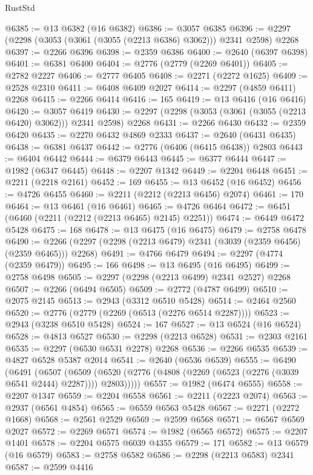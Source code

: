 \begin{lexlean}{RustStd}
\begin{coremodule}
@6385 := @13 @6382 (@16 @6382)
@6386 := @3057 @6385
@6396 := @2297 (@2298 (@3053 (@3061 (@3055 (@2213 @6386) @3062))) @2341 @2598) @2268
@6397 := @2266 @6396
@6398 := @2359 @6386
@6400 := @2640 (@6397 @6398)
@6401 := @6381 @6400
@6404 := @2776 (@2779 (@2269 @6401))
@6405 := @2782 @2227
@6406 := @2777 @6405
@6408 := @2271 (@2272 @1625)
@6409 := @2528 @2310
@6411 := @6408 @6409 @2027
@6414 := @2297 (@4859 @6411) @2268
@6415 := @2266 @6414
@6416 := 165
@6419 := @13 @6416 (@16 @6416)
@6420 := @3057 @6419
@6430 := @2297 (@2298 (@3053 (@3061 (@3055 (@2213 @6420) @3062))) @2341 @2598) @2268
@6431 := @2266 @6430
@6432 := @2359 @6420
@6435 := @2270 @6432 @4869 @2333
@6437 := @2640 (@6431 @6435)
@6438 := @6381 @6437
@6442 := @2776 (@6406 (@6415 @6438)) @2803
@6443 := @6404 @6442
@6444 := @6379 @6443
@6445 := @6377 @6444
@6447 := @1982 (@6347 @6445)
@6448 := @2207 @1342
@6449 := @2204 @6448
@6451 := @2211 (@2218 @2161)
@6452 := 169
@6455 := @13 @6452 (@16 @6452)
@6456 := @4726 @6455
@6460 := @2211 (@2212 (@2213 @6456) @2074)
@6461 := 170
@6464 := @13 @6461 (@16 @6461)
@6465 := @4726 @6464
@6472 := @6451 (@6460 (@2211 (@2212 (@2213 @6465) @2145) @2251))
@6474 := @6449 @6472 @5428
@6475 := 168
@6478 := @13 @6475 (@16 @6475)
@6479 := @2758 @6478
@6490 := @2266 (@2297 (@2298 (@2213 @6479) @2341 (@3039 (@2359 @6456) (@2359 @6465))) @2268)
@6491 := @4766 @6479
@6494 := @2297 (@4774 (@2359 @6479))
@6495 := 166
@6498 := @13 @6495 (@16 @6495)
@6499 := @2758 @6498
@6505 := @2297 (@2298 (@2213 @6499) @2341 @2527) @2268
@6507 := @2266 (@6494 @6505)
@6509 := @2772 (@4787 @6499)
@6510 := @2075 @2145
@6513 := @2943 (@3312 @6510 @5428)
@6514 := @2464 @2560
@6520 := @2776 (@2779 (@2269 (@6513 (@2276 @6514 @2287))))
@6523 := @2943 (@3238 @6510 @5428)
@6524 := 167
@6527 := @13 @6524 (@16 @6524)
@6528 := @4813 @6527
@6530 := @2298 (@2213 @6528)
@6531 := @2303 @2161
@6535 := @2297 (@6530 @6531 @2278) @2268
@6536 := @2266 @6535
@6539 := @4827 @6528 @5387 @2014
@6541 := @2640 (@6536 @6539)
@6555 := @6490
    (@6491
      (@6507
        (@6509 (@6520 (@2776 (@4808 (@2269 (@6523 (@2276 (@3039 @6541 @2444) @2287)))) @2803)))))
@6557 := @1982 (@6474 @6555)
@6558 := @2207 @1347
@6559 := @2204 @6558
@6561 := @2211 (@2223 @2074)
@6563 := @2937 (@6561 @4854)
@6565 := @6559 @6563 @5428
@6567 := @2271 (@2272 @1668)
@6568 := @2561 @2529
@6569 := @2599 @6568
@6571 := @6567 @6569 @2027
@6572 := @2269 @6571
@6574 := @1982 (@6565 @6572)
@6575 := @2207 @1401
@6578 := @2204 @6575 @6039 @4355
@6579 := 171
@6582 := @13 @6579 (@16 @6579)
@6583 := @2758 @6582
@6586 := @2298 (@2213 @6583) @2341
@6587 := @2599 @4416

\end{coremodule}
\end{lexlean}
